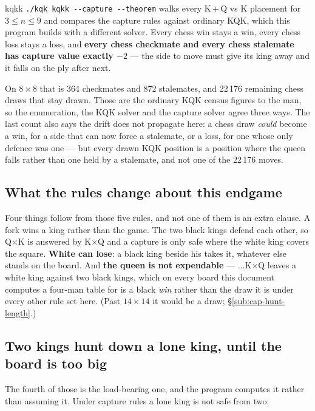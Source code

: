\documentclass[11pt]{article}
\begin{document}
\begin{result}[title={The theorem's first half, checked against the ordinary table}]{kqkk}
\texttt{./kqk kqkk -{}-capture -{}-theorem} walks every K\,+\,Q vs K placement
for $3\le n\le 9$ and compares the capture rules against ordinary KQK, which
this program builds with a different solver. Every chess win stays a win, every
chess loss stays a loss, and \textbf{every chess checkmate and every chess
stalemate has capture value exactly $-2$} --- the side to move must give its
king away and it falls on the ply after next.

\smallskip
On $8\times8$ that is 364 checkmates and 872 stalemates, and 22\,176 remaining
chess draws that stay drawn. Those are the ordinary KQK census figures to the
man, so the enumeration, the KQK solver and the capture solver agree three
ways. The last count also says the drift does not propagate here: a chess draw
\emph{could} become a win, for a side that can now force a stalemate, or a
loss, for one whose only defence was one --- but every drawn KQK position is a
position where the queen falls rather than one held by a stalemate, and not one
of the 22\,176 moves.
\end{result}

\subsection{What the rules change about this endgame}\label{sub:cap-changes}

Four things follow from those five rules, and not one of them is an extra
clause. A fork wins a king rather than the game. The two black kings defend
each other, so Q$\times$K is answered by K$\times$Q and a capture is only safe
where the white king covers the square. \textbf{White can lose}: a black king
beside his takes it, whatever else stands on the board. And \textbf{the queen
is not expendable} --- $\ldots$K$\times$Q leaves a white king against two black
kings, which on every board this document computes a four-man table for is a
black \emph{win} rather than the draw it is under every other rule set here.
(Past $14\times14$ it would be a draw; \S\ref{sub:cap-hunt-length}.)

\subsection{Two kings hunt down a lone king, until the board is too big}\label{sub:cap-hunt}

The fourth of those is the load-bearing one, and the program computes it rather
than assuming it. Under capture rules a lone king is not safe from two:
\end{document}
